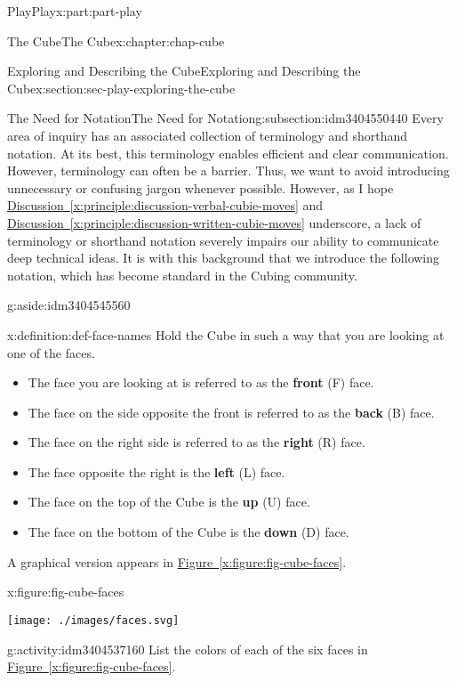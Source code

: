 \documentclass[oneside,10pt,]{book}
\newcommand{\xreffont}{\relax}
\newcommand{\terminology}[1]{\textbf{#1}}
\numberwithin{equation}{section}
\begin{document}
\begin{partptx}{Play}{}{Play}{}{}{x:part:part-play}
\begin{chapterptx}{The Cube}{}{The Cube}{}{}{x:chapter:chap-cube}
\begin{sectionptx}{Exploring and Describing the Cube}{}{Exploring and Describing the Cube}{}{}{x:section:sec-play-exploring-the-cube}
\begin{subsectionptx}{The Need for Notation}{}{The Need for Notation}{}{}{g:subsection:idm3404550440}
Every area of inquiry has an associated collection of terminology and shorthand notation. At its best, this terminology enables efficient and clear communication. However, terminology can often be a barrier. Thus, we want to avoid introducing unnecessary or confusing jargon whenever possible. However, as I hope \hyperref[x:principle:discussion-verbal-cubie-moves]{Discussion~{\xreffont\ref{x:principle:discussion-verbal-cubie-moves}}} and \hyperref[x:principle:discussion-written-cubie-moves]{Discussion~{\xreffont\ref{x:principle:discussion-written-cubie-moves}}} underscore, a lack of terminology or shorthand notation severely impairs our ability to communicate deep technical ideas. It is with this background that we introduce the following notation, which has become standard in the Cubing community.\begin{aside}{}{g:aside:idm3404545560}%
\end{aside}
%
\begin{definition}{}{x:definition:def-face-names}%
Hold the Cube in such a way that you are looking at one of the faces.%
\begin{itemize}[label=\textbullet]
\item{}The face you are looking at is referred to as the \terminology{front} (F) face.%
\item{}The face on the side opposite the front is referred to as the \terminology{back} (B) face.%
\item{}The face on the right side is referred to as the \terminology{right} (R) face.%
\item{}The face opposite the right is the \terminology{left} (L) face.%
\item{}The face on the top of the Cube is the \terminology{up} (U) face.%
\item{}The face on the bottom of the Cube is the \terminology{down} (D) face.%
\end{itemize}
A graphical version appears in \hyperref[x:figure:fig-cube-faces]{Figure~{\xreffont\ref{x:figure:fig-cube-faces}}}.%
\begin{figureptx}{}{x:figure:fig-cube-faces}{}%
\begin{image}{0.25}{0.5}{0.25}%
\texttt{[image: ./images/faces.svg]}
\end{image}%
\tcblower
\end{figureptx}%
\end{definition}
\begin{activity}{}{g:activity:idm3404537160}%
List the colors of each of the six faces in \hyperref[x:figure:fig-cube-faces]{Figure~{\xreffont\ref{x:figure:fig-cube-faces}}}.%

\end{activity}
\end{subsectionptx}
\end{sectionptx}
\end{chapterptx}
\end{partptx}
\end{document}
